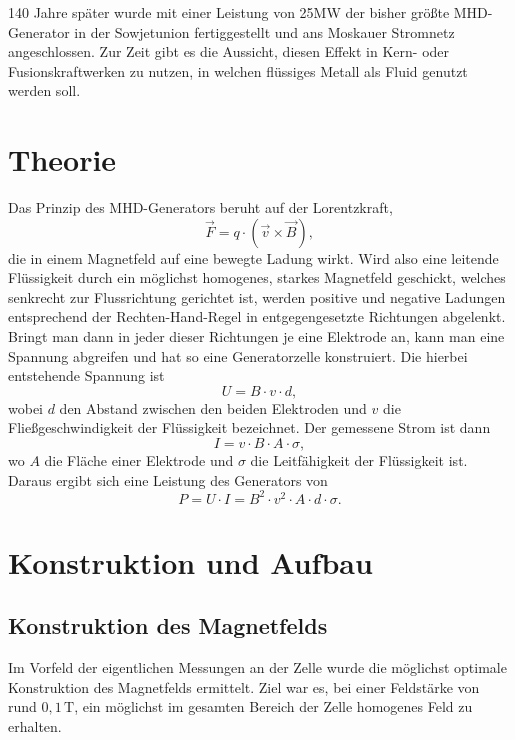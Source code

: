 \documentclass[11pt]{scrartcl}
\newcommand{\unit}[1]{\ensuremath{\,\mathrm{#1}}} %
\begin{document}
140 Jahre später wurde mit einer Leistung von 25MW der bisher größte MHD-Generator in der Sowjetunion fertiggestellt und ans Moskauer Stromnetz angeschlossen. Zur Zeit gibt es die Aussicht, diesen Effekt in Kern- oder Fusionskraftwerken zu nutzen, in welchen flüssiges Metall als Fluid genutzt werden soll.

\section{Theorie}	%


Das Prinzip des MHD-Generators beruht auf der Lorentzkraft,
\begin{equation}
\vec{F} = q \cdot \left(\vec{v} \times \vec{B} \right),
\end{equation}
die in einem Magnetfeld auf eine bewegte Ladung wirkt. Wird also eine leitende Fl\"ussigkeit durch ein m\"oglichst homogenes, starkes Magnetfeld geschickt, welches senkrecht zur Flussrichtung gerichtet ist, werden positive und negative Ladungen entsprechend der Rechten-Hand-Regel in entgegengesetzte Richtungen abgelenkt. Bringt man dann in jeder dieser Richtungen je eine Elektrode an, kann man eine Spannung abgreifen und hat so eine Generatorzelle konstruiert. Die hierbei entstehende Spannung ist
\begin{equation}
U = B \cdot v \cdot d,
\end{equation}
wobei $d$ den Abstand zwischen den beiden Elektroden und $v$ die Flie\ss{}geschwindigkeit der Fl\"ussigkeit bezeichnet. Der gemessene Strom ist dann 
\begin{equation}
I = v \cdot B \cdot A \cdot \sigma,
\end{equation}
wo $A$ die Fl\"ache einer Elektrode und $\sigma$ die Leitf\"ahigkeit der Fl\"ussigkeit ist. Daraus ergibt sich eine Leistung des Generators von
\begin{equation}
P = U \cdot I = B^{2} \cdot v^{2} \cdot A \cdot d \cdot \sigma.
\end{equation}


\section{Konstruktion und Aufbau}

\subsection{Konstruktion des Magnetfelds}		%
Im Vorfeld der eigentlichen Messungen an der Zelle wurde die möglichst optimale Konstruktion des Magnetfelds ermittelt. Ziel war es, bei einer Feldstärke von rund $0,1 \unit{T}$, ein möglichst im gesamten Bereich der Zelle homogenes Feld zu erhalten.
\end{document}
